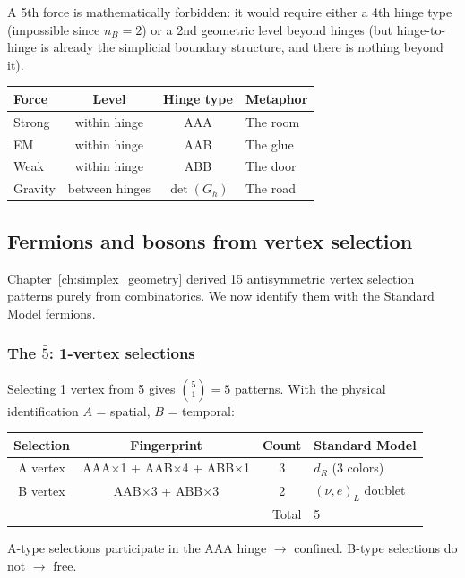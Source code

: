 \documentclass[12pt]{article}
\theoremstyle{remark}
\theoremstyle{definition}
\begin{document}
A 5th force is mathematically forbidden: it would require either a 4th hinge type (impossible since $n_B = 2$) or a 2nd geometric level beyond hinges (but hinge-to-hinge is already the simplicial boundary structure, and there is nothing beyond it).

\begin{center}
\begin{tabular}{lccl}
\hline
Force & Level & Hinge type & Metaphor \\
\hline
Strong & within hinge & AAA & The room \\
EM & within hinge & AAB & The glue \\
Weak & within hinge & ABB & The door \\
Gravity & between hinges & $\det(G_h)$ & The road \\
\hline
\end{tabular}
\end{center}

\subsection{Fermions and bosons from vertex selection}
\label{sec:spin_statistics}

Chapter~\ref{ch:simplex_geometry} derived 15 antisymmetric vertex selection patterns purely from combinatorics. We now identify them with the Standard Model fermions.

\subsubsection{The $\bar{5}$: 1-vertex selections}

Selecting 1 vertex from 5 gives $\binom{5}{1} = 5$ patterns. With the physical identification $A$ = spatial, $B$ = temporal:

\begin{center}
\begin{tabular}{cccl}
\hline
Selection & Fingerprint & Count & Standard Model \\
\hline
A vertex & AAA$\times$1 + AAB$\times$4 + ABB$\times$1 & 3 & $d_R$ (3 colors) \\
B vertex & AAB$\times$3 + ABB$\times$3 & 2 & $(\nu, e)_L$ doublet \\
\hline
\multicolumn{3}{r}{Total} & 5 \\
\hline
\end{tabular}
\end{center}

A-type selections participate in the AAA hinge $\to$ confined. B-type selections do not $\to$ free.
\end{document}
